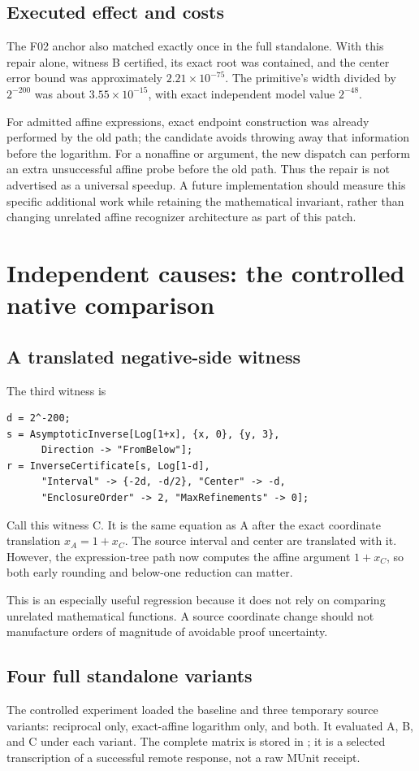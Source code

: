 \documentclass[11pt,letterpaper]{article}
\newcommand{\code}[1]{\texttt{\detokenize{#1}}}
\newcommand{\src}[1]{\texttt{\small\detokenize{#1}}}
\theoremstyle{remark}\newtheorem{remark}[proposition]{Remark}
\begin{document}
\subsection{Executed effect and costs}
The F02 anchor also matched exactly once in the full standalone. With this
repair alone, witness B certified, its exact root was contained, and the
center error bound was approximately $2.21\times10^{-75}$. The primitive's
width divided by $2^{-200}$ was about $3.55\times10^{-15}$, with exact
independent model value $2^{-48}$.

For admitted affine expressions, exact endpoint construction was already
performed by the old path; the candidate avoids throwing away that
information before the logarithm. For a nonaffine \code{Plus} or
\code{Times} argument, the new dispatch can perform an extra unsuccessful
affine probe before the old path. Thus the repair is not advertised as a
universal speedup. A future implementation should measure this specific
additional work while retaining the mathematical invariant, rather than
changing unrelated affine recognizer architecture as part of this patch.

\section{Independent causes: the controlled native comparison}
\subsection{A translated negative-side witness}
The third witness is
\begin{lstlisting}
d = 2^-200;
s = AsymptoticInverse[Log[1+x], {x, 0}, {y, 3},
      Direction -> "FromBelow"];
r = InverseCertificate[s, Log[1-d],
      "Interval" -> {-2d, -d/2}, "Center" -> -d,
      "EnclosureOrder" -> 2, "MaxRefinements" -> 0];
\end{lstlisting}
Call this witness C. It is the same equation as A after the exact coordinate
translation $x_A=1+x_C$. The source interval and center are translated with
it. However, the expression-tree path now computes the affine argument
$1+x_C$, so both early rounding and below-one reduction can matter.

This is an especially useful regression because it does not rely on comparing
unrelated mathematical functions. A source coordinate change should not
manufacture orders of magnitude of avoidable proof uncertainty.

\subsection{Four full standalone variants}
The controlled experiment loaded the baseline and three temporary source
variants: reciprocal only, exact-affine logarithm only, and both. It evaluated
A, B, and C under each variant. The complete matrix is stored in
\src{evidence/native-matrix.json}; it is a selected transcription of a
successful remote response, not a raw MUnit receipt.
\end{document}

